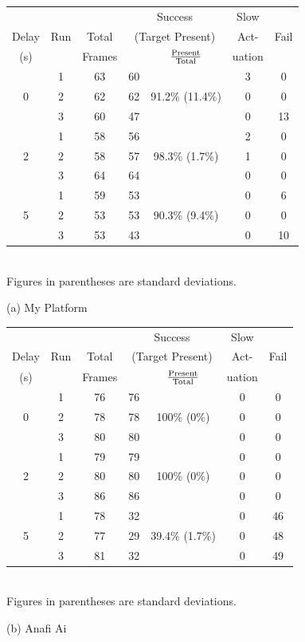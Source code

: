 \begin{table}
	\centering\small
	\begin{tabular}{|c|c|c|c|c|c|c|}
		\hline
		 &  &  & \multicolumn{2}{c|}{Success} & Slow & \\
		Delay & Run & Total  & \multicolumn{2}{c|}{\footnotesize (Target Present)} & Act- &  Fail\\
		\cline{5-5} 
		(s)&  &       Frames  &         & $\rm \frac{Present}{Total}$ & uation  & \\ 
		\hline
		& 1 & 63 & 60 & & 3 & 0 \\
		0 & 2 & 62 & 62 & 91.2\% \scriptsize{(11.4\%)}  & 0 & 0 \\
		& 3 & 60 & 47 & & 0 & 13\\
		\hline
		& 1 & 58 & 56 & & 2 & 0 \\
		2 & 2 & 58 & 57 & 98.3\% \scriptsize{(1.7\%)} & 1 & 0 \\
		& 3 & 64 & 64 & & 0 & 0 \\
		\hline
		& 1 & 59 & 53 & & 0 & 6 \\
		5 & 2 & 53 & 53 & 90.3\% \scriptsize{(9.4\%)} & 0 & 0  \\
		& 3 & 53 & 43 & & 0 & 10 \\
		\hline
	\end{tabular}
	\begin{captext}
		\centering \\[0.1cm] \small Figures in parentheses are standard deviations. \\
	\end{captext}
{(a) My Platform}\\[0.2in]

\begin{tabular}{|c|c|c|c|c|c|c|}
\hline
		 &  &  & \multicolumn{2}{c|}{Success} & Slow & \\
Delay & Run & Total  & \multicolumn{2}{c|}{\footnotesize (Target Present)} & Act- &  Fail\\
\cline{5-5} 
(s)&  &       Frames  &         & $\rm \frac{Present}{Total}$ & uation  & \\ 
\hline
    & 1 & 76 & 76 &    & 0 & 0 \\
0 & 2 & 78 & 78 & 100\% \scriptsize{(0\%)} & 0 & 0 \\
    & 3 & 80 & 80 &    & 0 & 0 \\
\hline
    & 1 & 79 & 79 &        & 0 & 0 \\
2 & 2 & 80 & 80 & 100\% \scriptsize{(0\%)} & 0 &  0 \\
    & 3 & 86 & 86 &        & 0 &  0 \\
\hline
    & 1 & 78 & 32 &        & 0 &  46 \\
5 & 2 & 77 & 29 & 39.4\% \scriptsize{(1.7\%)} & 0 & 48 \\
    & 3 & 81 & 32 &        & 0 &  49 \\
\hline
\end{tabular}
\begin{captext}
\centering \\[0.1cm] \small Figures in parentheses are standard deviations. \\
\end{captext}
{(b) Anafi Ai}


\end{table}

